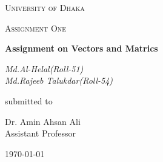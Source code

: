 \documentclass[12pt,a4paper]{report}
\begin{document}
\begin{titlepage}
\centering
{\scshape\LARGE University of Dhaka \par}
\vspace{1cm}
{\scshape\Large Assignment One\par}
\vspace{1.5cm}
{\huge\bfseries Assignment on Vectors and Matrics\par}
\vspace{2cm}
{\Large\itshape Md.Al-Helal(Roll-51)\\Md.Rajeeb Talukdar(Roll-54)\par}
\vfill
submitted to\par
Dr. Amin Ahsan Ali \\ Assistant Professor
\vfill
{\large \today\par}
\end{titlepage}
\end{document}
